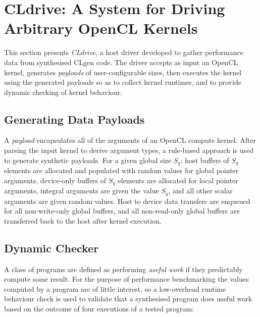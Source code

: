 \section{CLdrive: A System for Driving Arbitrary OpenCL Kernels}
\label{sec:cldrive}

This section presents \emph{CLdrive}, a host driver developed to gather performance data from synthesised CLgen code. The driver accepts as input an OpenCL kernel, generates \emph{payloads} of user-configurable sizes, then executes the kernel using the generated payloads so as to collect kernel runtimes, and to provide dynamic checking of kernel behaviour.


\subsection{Generating Data Payloads}

A \emph{payload} encapsulates all of the arguments of an OpenCL compute kernel. After parsing the input kernel to derive argument types, a rule-based approach is used to generate synthetic payloads. For a given global size $S_g$: host buffers of $S_g$ elements are allocated and populated with random values for global pointer arguments, device-only buffers of $S_g$ elements are allocated for local pointer arguments, integral arguments are given the value $S_g$, and all other scalar arguments are given random values. Host to device data transfers are enqueued for all non-write-only global buffers, and all non-read-only global buffers are transferred back to the host after kernel execution.


\subsection{Dynamic Checker}

A class of programs are defined as performing \emph{useful work} if they predictably compute some result. For the purpose of performance benchmarking the values computed by a program are of little interest, so a low-overhead runtime behaviour check is used to validate that a synthesised program does useful work based on the outcome of four executions of a tested program:


